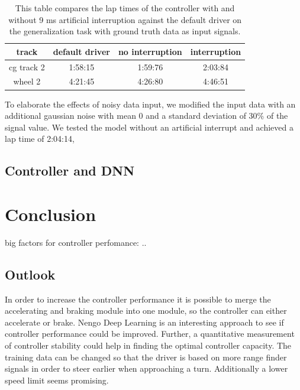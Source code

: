 \documentclass[10pt,a4paper,twoside,journal]{IEEEtran}
\begin{document}
\begin{table}[ht]
	\begin{center}
		\begin{tabular}{ |c|c|c|c| } 
			\hline
			track &  default driver & no interruption & interruption \\
			\hline
			cg track 2  & 1:58:15 & 1:59:76 & 2:03:84  \\
			wheel 2 & 4:21:45 & 4:26:80 & 4:46:51 \\
			\hline
		\end{tabular}
		\caption{\label{tab:controller_laptime}This table compares the lap times of the controller with and without 9 ms artificial interruption against the default driver on the generalization task with ground truth data as input signals.}
	\end{center}
\end{table}
To elaborate the effects of noisy data input, we modified the input data with an additional gaussian noise with mean 0 and a standard deviation of 30\% of the signal value. We tested the model without an artificial interrupt and achieved a lap time of 2:04:14,

\subsection{Controller and DNN}



\section{Conclusion}
\label{sc:conclusion}
big factors for controller perfomance: ..

\subsection{Outlook}
\label{ssc:outlook}
In order to increase the controller performance it is possible to merge the accelerating and braking module into one module, so the controller can either accelerate or brake. Nengo Deep Learning is an interesting approach to see if controller performance could be improved. Further, a quantitative measurement of controller stability could help in finding the optimal controller capacity. The training data can be changed so that the driver is based on more range finder signals in order to steer earlier when approaching a turn. Additionally a lower speed limit seems promising.



\end{document}
